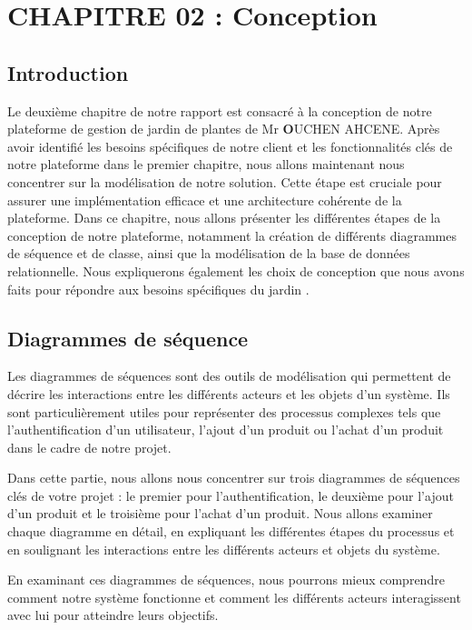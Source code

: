 \documentclass[a4paper,12pt,oneside]{article}
\begin{document}
\section{CHAPITRE 02 : Conception}
{\fontsize{15}{20}\selectfont 
\subsection{Introduction}

\hspace{1cm} Le deuxième chapitre de notre rapport est consacré à la conception de notre plateforme de gestion de jardin de plantes de Mr \textbf OUCHEN AHCENE. Après avoir identifié les besoins spécifiques de notre client et les fonctionnalités clés de notre plateforme dans le premier chapitre, nous allons maintenant nous concentrer sur la modélisation de notre solution. Cette étape est cruciale pour assurer une implémentation efficace et une architecture cohérente de la plateforme. Dans ce chapitre, nous allons présenter les différentes étapes de la conception de notre plateforme, notamment la création de différents diagrammes de séquence et de classe, ainsi que la modélisation de la base de données relationnelle. Nous expliquerons également les choix de conception que nous avons faits pour répondre aux besoins spécifiques du jardin .

\subsection{Diagrammes de séquence}
\hspace{1cm} Les diagrammes de séquences sont des outils de modélisation qui permettent de décrire les interactions entre les différents acteurs et les objets d'un système. Ils sont particulièrement utiles pour représenter des processus complexes tels que l'authentification d'un utilisateur, l'ajout d'un produit ou l'achat d'un produit dans le cadre de notre projet.

Dans cette partie, nous allons nous concentrer sur trois diagrammes de séquences clés de votre projet : le premier pour l'authentification, le deuxième pour l'ajout d'un produit et le troisième pour l'achat d'un produit. Nous allons examiner chaque diagramme en détail, en expliquant les différentes étapes du processus et en soulignant les interactions entre les différents acteurs et objets du système.

En examinant ces diagrammes de séquences, nous pourrons mieux comprendre comment notre système fonctionne et comment les différents acteurs interagissent avec lui pour atteindre leurs objectifs.

}
\end{document}
